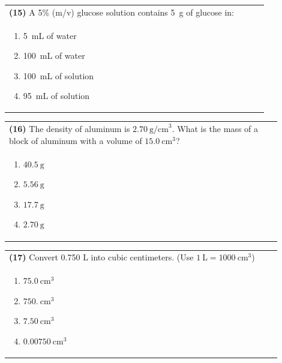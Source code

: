 \documentclass{article}
\begin{document}
\noindent\begin{tabular}{|p{0.9\linewidth}|}
\hline
\textbf{(15)} A 5\% (m/v) glucose solution contains 5~g of glucose in:\\[0.2cm]
\begin{minipage}[t]{0.85\linewidth}
\begin{enumerate}[label=\alph*.]
\item 5~mL of water
\item 100~mL of water
\item 100~mL of solution
\item 95~mL of solution
\end{enumerate}
\end{minipage}\\[0.2cm]
\hline
\end{tabular}

\noindent\begin{tabular}{|p{0.9\linewidth}|}
\hline
\textbf{(16)} The density of aluminum is $2.70~\text{g/cm}^3$. What is the mass of a block of aluminum with a volume of $15.0~\text{cm}^3$? \\
\begin{minipage}[t]{0.85\linewidth}
\begin{enumerate}[label=\alph*.]
    \item $40.5~\text{g}$
    \item $5.56~\text{g}$
    \item $17.7~\text{g}$
    \item $2.70~\text{g}$
\end{enumerate}
\end{minipage}\\[0.2cm]
\hline
\end{tabular}

\noindent\begin{tabular}{|p{0.9\linewidth}|}
\hline
\textbf{(17)} Convert 0.750 L into cubic centimeters. (Use $1~\text{L} = 1000~\text{cm}^3$) \\
\begin{minipage}[t]{0.85\linewidth}
\begin{enumerate}[label=\alph*.]
    \item $75.0~\text{cm}^3$
    \item $750.~\text{cm}^3$
    \item $7.50~\text{cm}^3$
    \item $0.00750~\text{cm}^3$
\end{enumerate}
\end{minipage}\\[0.2cm]
\hline
\end{tabular}
\end{document}
